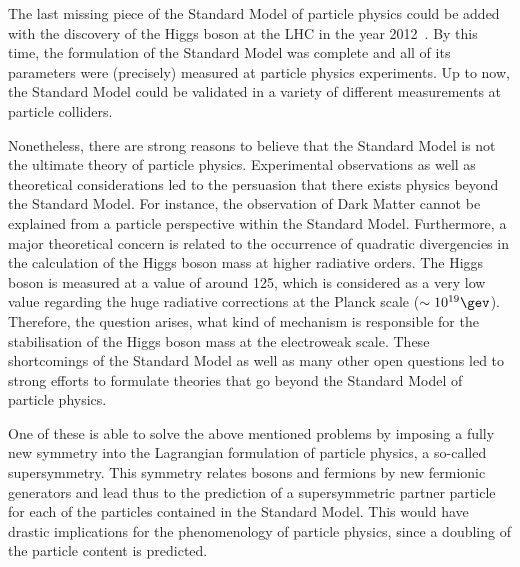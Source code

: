 The last missing piece of the Standard Model of particle physics could be added with the discovery of the Higgs boson at the LHC in the year 2012~\cite{bib:Theory:CMS:HiggsObservation,bib:Theory:Atlas:HiggsObservation}.
By this time, the formulation of the Standard Model was complete and all of its parameters were (precisely) measured at particle physics experiments. 
Up to now, the Standard Model could be validated in a variety of different measurements at particle colliders.

Nonetheless, there are strong reasons to believe that the Standard Model is not the ultimate theory of particle physics.
Experimental observations as well as theoretical considerations led to the persuasion that there exists physics beyond the Standard Model.
For instance, the observation of Dark Matter cannot be explained from a particle perspective within the Standard Model.
Furthermore, a major theoretical concern is related to the occurrence of quadratic divergencies in the calculation of the Higgs boson mass at higher radiative orders.
The Higgs boson is measured at a value of around 125\gev, which is considered as a very low value regarding the huge radiative corrections at the Planck scale ($\sim 10^{19}\gev$). 
Therefore, the question arises, what kind of mechanism is responsible for the stabilisation of the Higgs boson mass at the electroweak scale. 
These shortcomings of the Standard Model as well as many other open questions led to strong efforts to formulate theories that go beyond the Standard Model of particle physics. 

One of these is able to solve the above mentioned problems by imposing a fully new symmetry into the Lagrangian formulation of particle physics, a so-called supersymmetry.
This symmetry relates bosons and fermions by new fermionic generators and lead thus to the prediction of a supersymmetric partner particle for each of the particles contained in the Standard Model.
This would have drastic implications for the phenomenology of particle physics, since a doubling of the particle content is predicted.


